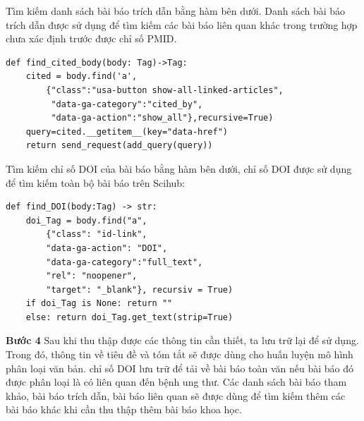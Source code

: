\documentclass[../DoAn.tex]{subfiles}
\begin{document}
Tìm kiếm danh sách bài báo trích dẫn bằng hàm bên dưới. Danh sách bài báo trích dẫn được sử dụng để tìm kiếm các bài báo liên quan khác trong trường hợp chưa xác định trước được chỉ số PMID.
\begin{lstlisting}
def find_cited_body(body: Tag)->Tag:
    cited = body.find('a',
        {"class":"usa-button show-all-linked-articles",
         "data-ga-category":"cited_by", 
         "data-ga-action":"show_all"},recursive=True)
    query=cited.__getitem__(key="data-href")
    return send_request(add_query(query))
\end{lstlisting}

Tìm kiếm chỉ số DOI của bài báo bằng hàm bên dưới, chỉ số DOI được sử dụng để tìm kiếm toàn bộ bài báo trên Scihub:
\begin{lstlisting}
def find_DOI(body:Tag) -> str:
    doi_Tag = body.find("a",
        {"class": "id-link",
        "data-ga-action": "DOI",
        "data-ga-category":"full_text",
        "rel": "noopener",
        "target": "_blank"}, recursiv = True)
    if doi_Tag is None: return ""
    else: return doi_Tag.get_text(strip=True)
\end{lstlisting}

\textbf{Bước 4} Sau khi thu thập được các thông tin cần thiết, ta lưu trữ lại để sử dụng. Trong đó, thông tin về tiêu đề và tóm tắt sẽ được dùng cho huấn luyện mô hình phân loại văn bản. chỉ số DOI lưu trữ để tải về bài báo toàn văn nếu bài báo đó được phân loại là có liên quan đến bệnh ung thư. Các danh sách bài báo tham khảo, bài báo trích dẫn, bài báo liên quan sẽ được dùng để tìm kiếm thêm các bài báo khác khi cần thu thập thêm bài báo khoa học.
\end{document}

